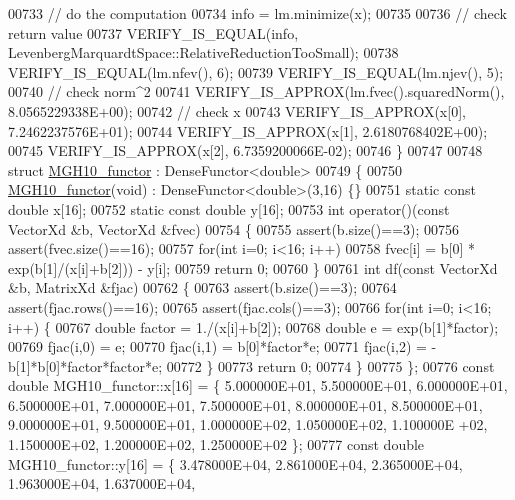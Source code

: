 \begin{DoxyCode}
00733   \textcolor{comment}{// do the computation}
00734   info = lm.minimize(x);
00735 
00736   \textcolor{comment}{// check return value}
00737   VERIFY\_IS\_EQUAL(info, LevenbergMarquardtSpace::RelativeReductionTooSmall);
00738   VERIFY\_IS\_EQUAL(lm.nfev(), 6);
00739   VERIFY\_IS\_EQUAL(lm.njev(), 5);
00740   \textcolor{comment}{// check norm^2}
00741   VERIFY\_IS\_APPROX(lm.fvec().squaredNorm(), 8.0565229338E+00);
00742   \textcolor{comment}{// check x}
00743   VERIFY\_IS\_APPROX(x[0], 7.2462237576E+01);
00744   VERIFY\_IS\_APPROX(x[1], 2.6180768402E+00);
00745   VERIFY\_IS\_APPROX(x[2], 6.7359200066E-02);
00746 \}
00747 
00748 \textcolor{keyword}{struct }\hyperlink{struct_m_g_h10__functor}{MGH10\_functor} : DenseFunctor<double>
00749 \{
00750     \hyperlink{struct_m_g_h10__functor}{MGH10\_functor}(\textcolor{keywordtype}{void}) : DenseFunctor<double>(3,16) \{\}
00751     \textcolor{keyword}{static} \textcolor{keyword}{const} \textcolor{keywordtype}{double} x[16];
00752     \textcolor{keyword}{static} \textcolor{keyword}{const} \textcolor{keywordtype}{double} y[16];
00753     \textcolor{keywordtype}{int} operator()(\textcolor{keyword}{const} VectorXd &b, VectorXd &fvec)
00754     \{
00755         assert(b.size()==3);
00756         assert(fvec.size()==16);
00757         \textcolor{keywordflow}{for}(\textcolor{keywordtype}{int} i=0; i<16; i++)
00758             fvec[i] =  b[0] * exp(b[1]/(x[i]+b[2])) - y[i];
00759         \textcolor{keywordflow}{return} 0;
00760     \}
00761     \textcolor{keywordtype}{int} df(\textcolor{keyword}{const} VectorXd &b, MatrixXd &fjac)
00762     \{
00763         assert(b.size()==3);
00764         assert(fjac.rows()==16);
00765         assert(fjac.cols()==3);
00766         \textcolor{keywordflow}{for}(\textcolor{keywordtype}{int} i=0; i<16; i++) \{
00767             \textcolor{keywordtype}{double} factor = 1./(x[i]+b[2]);
00768             \textcolor{keywordtype}{double} e = exp(b[1]*factor);
00769             fjac(i,0) = e;
00770             fjac(i,1) = b[0]*factor*e;
00771             fjac(i,2) = -b[1]*b[0]*factor*factor*e;
00772         \}
00773         \textcolor{keywordflow}{return} 0;
00774     \}
00775 \};
00776 \textcolor{keyword}{const} \textcolor{keywordtype}{double} MGH10\_functor::x[16] = \{ 5.000000E+01, 5.500000E+01, 6.000000E+01, 6.500000E+01, 7.000000E+01,
       7.500000E+01, 8.000000E+01, 8.500000E+01, 9.000000E+01, 9.500000E+01, 1.000000E+02, 1.050000E+02, 1.100000E
      +02, 1.150000E+02, 1.200000E+02, 1.250000E+02 \};
00777 \textcolor{keyword}{const} \textcolor{keywordtype}{double} MGH10\_functor::y[16] = \{ 3.478000E+04, 2.861000E+04, 2.365000E+04, 1.963000E+04, 1.637000E+04,

\end{DoxyCode}
